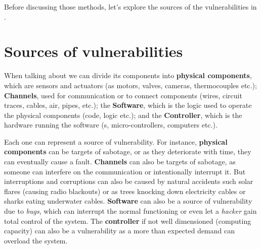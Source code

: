 \documentclass[../main.tex]{subfiles}
\begin{document}
Before discussing those methods, let's explore the sources of the vulnerabilities in \cps{}.

\section{Sources of vulnerabilities}

When talking about \cps{} we can divide its components into \textbf{physical components}, which are sensors and actuators (as motors, valves, cameras, thermocouples etc.);
\textbf{Channels}, used for communication or to connect components (wires, circuit traces, cables, air, pipes, etc.);
the \textbf{Software}, which is the logic used to operate the physical components (code, \plc{} logic etc.); and the \textbf{Controller}, which is the hardware running the software (\plc{}s, micro-controllers, computers etc.).

Each one can represent a source of vulnerability. For instance, \textbf{physical components} can be targets of sabotage, or as they deteriorate with time, they can eventually cause a fault.
\textbf{Channels} can also be targets of sabotage, as someone can interfere on the communication or intentionally interrupt it. But interruptions and corruptions can also be caused by natural accidents such solar flares (causing radio blackouts) or as trees knocking down electricity cables or sharks eating underwater cables.
\textbf{Software} can also be a source of vulnerability due to \emph{bugs}, which can interrupt the normal functioning or even let a \emph{hacker} gain total control of the system.
The \textbf{controller} if not well dimensioned (computing capacity) can also be a vulnerability as a more than expected demand can overload the system.


\printbibliography%
\end{document}
